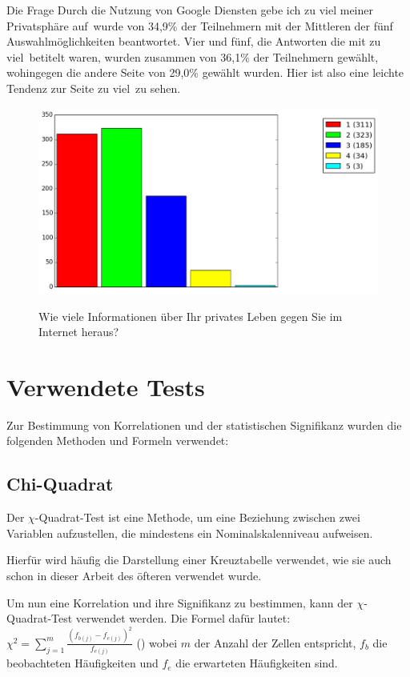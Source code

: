 Die Frage \glqq Durch die Nutzung von Google Diensten gebe ich zu viel meiner Privatsphäre auf\grqq\ wurde von 34,9\% der Teilnehmern mit der Mittleren der fünf Auswahlmöglichkeiten beantwortet. Vier und fünf, die Antworten die mit \glqq zu viel\grqq\ betitelt waren, wurden zusammen von 36,1\% der Teilnehmern gewählt, wohingegen die andere Seite von 29,0\% gewählt wurden. Hier ist also eine leichte Tendenz zur Seite \glqq zu viel\grqq\ zu sehen.

\begin{figure}[H]
\centering
\includegraphics[scale=0.55]{images/giveinfo}\\
\caption{Wie viele Informationen über Ihr privates Leben gegen Sie im Internet heraus?}\label{giveinfo}
\end{figure}

\section{Verwendete Tests}
\label{sec:tests}
Zur Bestimmung von Korrelationen und der statistischen Signifikanz wurden die folgenden Methoden und Formeln verwendet:

\subsection{Chi-Quadrat}
\label{chisquared}
Der $\chi$-Quadrat-Test ist eine Methode, um eine Beziehung zwischen zwei Variablen aufzustellen, die mindestens ein Nominalskalenniveau aufweisen.

Hierfür wird häufig die Darstellung einer Kreuztabelle verwendet, wie sie auch schon in dieser Arbeit des öfteren verwendet wurde.

Um nun eine Korrelation und ihre Signifikanz zu bestimmen, kann der $\chi$-Quadrat-Test verwendet werden. Die Formel dafür lautet: $\chi^2 = \sum_{j=1}^m \frac{(f_{b(j)} - f_{e(j)})^2}{f_{e(j)}}$ (\citet{statistikeinfuehrung}) wobei $m$ der Anzahl der Zellen entspricht, $f_b$ die beobachteten Häufigkeiten und $f_e$ die erwarteten Häufigkeiten sind.

